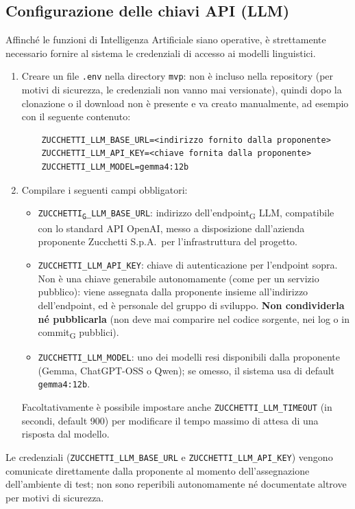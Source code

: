 \subsection{Configurazione delle chiavi API (LLM)}
Affinché le funzioni di Intelligenza Artificiale siano operative, è strettamente necessario fornire al sistema le credenziali di accesso ai modelli linguistici.
\begin{enumerate}
    \item Creare un file \texttt{.env} nella directory \texttt{mvp}: non è incluso nella repository (per motivi di sicurezza, le credenziali non vanno mai versionate), quindi dopo la clonazione o il download non è presente e va creato manualmente, ad esempio con il seguente contenuto:
    \begin{verbatim}
    ZUCCHETTI_LLM_BASE_URL=<indirizzo fornito dalla proponente>
    ZUCCHETTI_LLM_API_KEY=<chiave fornita dalla proponente>
    ZUCCHETTI_LLM_MODEL=gemma4:12b
    \end{verbatim}
    \item Compilare i seguenti campi obbligatori:
    \begin{itemize}
        \item \texttt{ZUCCHETTI\textsubscript{G}\_LLM\_BASE\_URL}: indirizzo dell'endpoint\textsubscript{G} LLM, compatibile con lo standard API OpenAI, messo a disposizione dall'azienda proponente Zucchetti S.p.A.\ per l'infrastruttura del progetto.
        \item \texttt{ZUCCHETTI\_LLM\_API\_KEY}: chiave di autenticazione per l'endpoint sopra. Non è una chiave generabile autonomamente (come per un servizio pubblico): viene assegnata dalla proponente insieme all'indirizzo dell'endpoint, ed è personale del gruppo di sviluppo. \textbf{Non condividerla né pubblicarla} (non deve mai comparire nel codice sorgente, nei log o in commit\textsubscript{G} pubblici).
        \item \texttt{ZUCCHETTI\_LLM\_MODEL}: uno dei modelli resi disponibili dalla proponente (Gemma, ChatGPT-OSS o Qwen); se omesso, il sistema usa di default \texttt{gemma4:12b}.
    \end{itemize}
    Facoltativamente è possibile impostare anche \texttt{ZUCCHETTI\_LLM\_TIMEOUT} (in secondi, default 900) per modificare il tempo massimo di attesa di una risposta dal modello.
\end{enumerate}
Le credenziali (\texttt{ZUCCHETTI\_LLM\_BASE\_URL} e \texttt{ZUCCHETTI\_LLM\_API\_KEY}) vengono comunicate direttamente dalla proponente 
al momento dell'assegnazione dell'ambiente di test; non sono reperibili autonomamente né documentate altrove per motivi di sicurezza.

